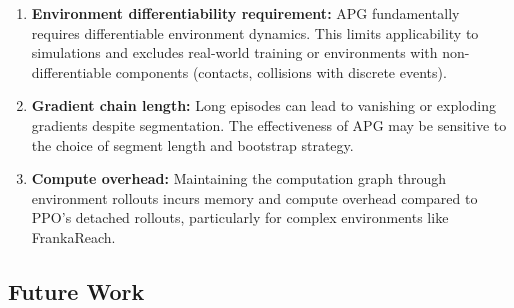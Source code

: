 \documentclass[11pt,a4paper]{article}
\begin{document}
\begin{enumerate}
  \item \textbf{Environment differentiability requirement:} APG fundamentally requires differentiable environment dynamics. This limits applicability to simulations and excludes real-world training or environments with non-differentiable components (contacts, collisions with discrete events).

  \item \textbf{Gradient chain length:} Long episodes can lead to vanishing or exploding gradients despite segmentation. The effectiveness of APG may be sensitive to the choice of segment length and bootstrap strategy.

  \item \textbf{Compute overhead:} Maintaining the computation graph through environment rollouts incurs memory and compute overhead compared to PPO's detached rollouts, particularly for complex environments like FrankaReach.
\end{enumerate}

\subsection{Future Work}
\label{sec:future}
\end{document}
